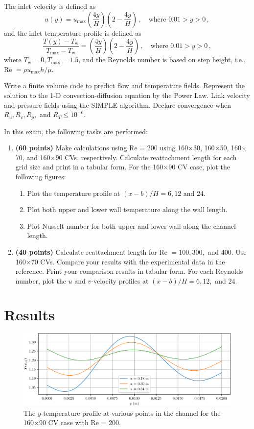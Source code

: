 \documentclass{article}
\begin{document}
The inlet velocity is defined as
\[
	u(y) = u_\mathrm{max} \left(\frac{4y}{H}\right) \left(2 - \frac{4y}{H}\right)\,, \quad \text{where } 0.01 > y > 0\,,
\]
and the inlet temperature profile is defined as
\[
	\frac{T(y) - T_\mathrm{w}}{T_\mathrm{max} - T_\mathrm{w}} = \left(\frac{4y}{H}\right) \left(2 - \frac{4y}{H}\right)\,, \quad \text{where } 0.01 > y > 0\,,
\]
where $T_\mathrm{w} = 0, T_\mathrm{max} = 1.5$, and the Reynolds number is based on step height, i.e., Re $=\rho u_\mathrm{max} h/\mu$.

Write a finite volume code to predict flow and temperature fields. Represent the solution to the 1-D convection-diffusion equation by the Power Law. Link velocity and pressure fields using the SIMPLE algorithm. Declare convergence when $R_u, R_v, R_p,$ and $R_T \leq 10^{-6}$.

In this exam, the following tasks are performed:
\begin{enumerate}
	\item \textbf{(60 points)} Make calculations using Re = 200 using 160$\times$30, 160$\times$50, 160$\times$70, and 160$\times$90 CVs, respectively. Calculate reattachment length for each grid size and print in a tabular form. For the 160$\times$90 CV case, plot the following figures:
	\begin{enumerate}[label=(\alph*)]
		\item Plot the temperature profile at $(x - b)/H = 6, 12$ and $24$.
		\item Plot both upper and lower wall temperature along the wall length.
		\item Plot Nusselt number for both upper and lower wall along the channel length.
	\end{enumerate}
	\item \textbf{(40 points)} Calculate reattachment length for Re $= 100, 300,$ and $400$. Use 160$\times$70 CVs. Compare your results with the experimental data in the reference. Print your comparison results in tabular form. For each Reynolds number, plot the $u$ and $v$-velocity profiles at $(x - b)/H = 6, 12,$ and $24$.
\end{enumerate}

\section{Results}

\begin{figure}[H]
	\centering
	\includegraphics[width=0.9\linewidth]{../results/1a_Ty}
	\caption{The $y$-temperature profile at various points in the channel for the 160$\times$90 CV case with Re = 200.}
	\label{fig:1a_Ty}
\end{figure}
\end{document}

